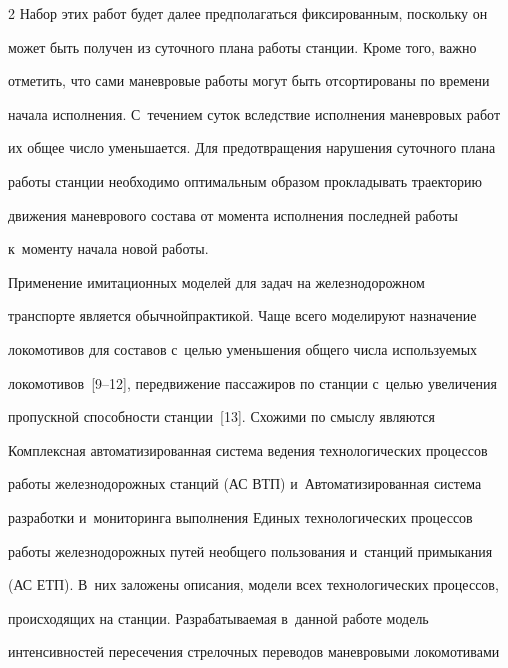 \begin{multicols}{2}
Набор этих работ будет далее предполагаться фиксированным, поскольку он 


может быть получен из суточного плана работы станции. Кроме того, важно 


отметить, что сами маневровые работы могут быть отсортированы по времени 


начала исполнения. С~течением суток вследствие исполнения маневровых работ 


их общее число уменьшается. Для предотвращения нарушения суточного плана 


работы станции необходимо оптимальным образом прокладывать траекторию 


движения маневрового состава от момента исполнения последней работы 


к~моменту начала новой работы.


{





}


      


      


      Применение имитационных моделей для задач на железнодорожном 


транспорте является обычной\linebreak практикой. Чаще всего моделируют назначение\linebreak 


локомотивов для составов с~целью уменьшения общего числа используемых  


локомотивов~[9--12], передвижение пассажиров по станции с~целью увеличения 


пропускной способности станции~[13]. Схожими по смыслу являются 


Комплексная автоматизированная система ведения технологических процессов 


работы железнодорожных станций (АС ВТП) и~Автоматизированная система 


разработки и~мониторинга выполнения Единых технологических процессов 


работы железнодорожных путей необщего пользования и~станций примыкания 


(АС ЕТП). В~них заложены описания, модели всех технологических процессов, 


происходящих на станции. Разрабатываемая в~данной работе модель 


интенсивностей пересечения стрелочных переводов маневровыми локомотивами 



\end{multicols}
